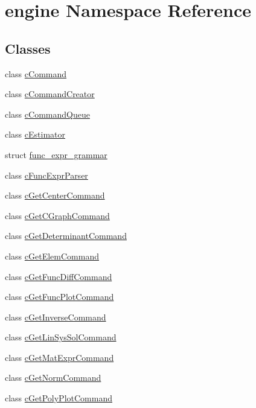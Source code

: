 \hypertarget{namespaceengine}{\section{engine Namespace Reference}
\label{namespaceengine}
}
\subsection*{Classes}
\begin{DoxyCompactItemize}
\item 
class \hyperlink{classengine_1_1cCommand}{c\-Command}
\item 
class \hyperlink{classengine_1_1cCommandCreator}{c\-Command\-Creator}
\item 
class \hyperlink{classengine_1_1cCommandQueue}{c\-Command\-Queue}
\item 
class \hyperlink{classengine_1_1cEstimator}{c\-Estimator}
\item 
struct \hyperlink{structengine_1_1func__expr__grammar}{func\-\_\-expr\-\_\-grammar}
\item 
class \hyperlink{classengine_1_1cFuncExprParser}{c\-Func\-Expr\-Parser}
\item 
class \hyperlink{classengine_1_1cGetCenterCommand}{c\-Get\-Center\-Command}
\item 
class \hyperlink{classengine_1_1cGetCGraphCommand}{c\-Get\-C\-Graph\-Command}
\item 
class \hyperlink{classengine_1_1cGetDeterminantCommand}{c\-Get\-Determinant\-Command}
\item 
class \hyperlink{classengine_1_1cGetElemCommand}{c\-Get\-Elem\-Command}
\item 
class \hyperlink{classengine_1_1cGetFuncDiffCommand}{c\-Get\-Func\-Diff\-Command}
\item 
class \hyperlink{classengine_1_1cGetFuncPlotCommand}{c\-Get\-Func\-Plot\-Command}
\item 
class \hyperlink{classengine_1_1cGetInverseCommand}{c\-Get\-Inverse\-Command}
\item 
class \hyperlink{classengine_1_1cGetLinSysSolCommand}{c\-Get\-Lin\-Sys\-Sol\-Command}
\item 
class \hyperlink{classengine_1_1cGetMatExprCommand}{c\-Get\-Mat\-Expr\-Command}
\item 
class \hyperlink{classengine_1_1cGetNormCommand}{c\-Get\-Norm\-Command}
\item 
class \hyperlink{classengine_1_1cGetPolyPlotCommand}{c\-Get\-Poly\-Plot\-Command}

\end{DoxyCompactItemize}
